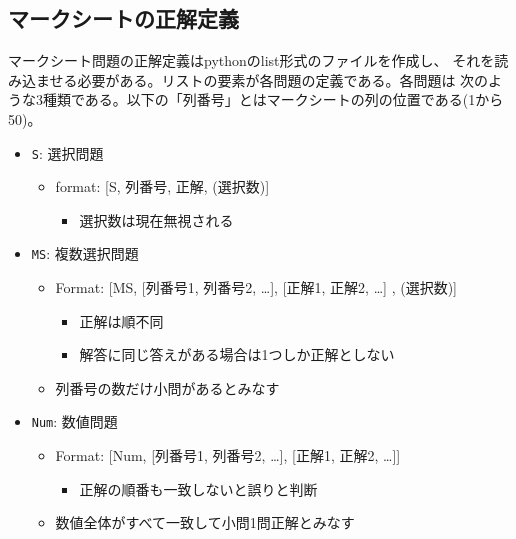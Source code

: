 \subsection{マークシートの正解定義}
\label{mksheet-ref}

マークシート問題の正解定義はpythonのlist形式のファイルを作成し、
それを読み込ませる必要がある。リストの要素が各問題の定義である。各問題は
次のような3種類である。以下の「列番号」とはマークシートの列の位置である(1から50)。

\begin{itemize}
\item \texttt{S}: 選択問題

\begin{itemize}
\item format: {[S, 列番号, 正解, (選択数)]}

\begin{itemize}
\item 選択数は現在無視される

\end{itemize}

\end{itemize}

\item \texttt{MS}: 複数選択問題

\begin{itemize}
\item Format: {[MS, {[列番号1, 列番号2, {\ldots}]}, {[正解1, 正解2, {\ldots}]} , (選択数)]}

\begin{itemize}
\item 正解は順不同

\item 解答に同じ答えがある場合は1つしか正解としない

\end{itemize}

\item 列番号の数だけ小問があるとみなす

\end{itemize}

\item \texttt{Num}: 数値問題

\begin{itemize}
\item Format: {[Num, {[列番号1, 列番号2, {\ldots}]}, {[正解1, 正解2, {\ldots}]}]}

\begin{itemize}
\item 正解の順番も一致しないと誤りと判断

\end{itemize}

\item 数値全体がすべて一致して小問1問正解とみなす

\end{itemize}

\end{itemize}

